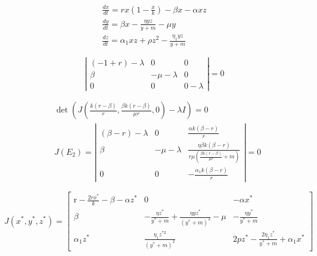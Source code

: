 \documentclass{wscpaperproc}
\theoremstyle{wsc}
\begin{document}
\begin{equation} \label{twoPreyonePredatorEDO}
	\begin{gathered}
		\frac{d x}{d t}=r x\left(1-\frac{x}{k}\right)-\beta x-\alpha x z \\
		\frac{d y}{d t}=\beta x-\frac{\eta y z}{y+m}-\mu y \\
		\frac{d z}{d t}=\alpha_1 x z+\rho z^2-\frac{\eta_1 y z}{y+m}
	\end{gathered}
\end{equation}

\begin{equation} \label{Characteristic000}
	\left|\begin{array}{ccc}
		(-1+r)-\lambda & 0            & 0         \\
		\beta          & -\mu-\lambda & 0         \\
		0              & 0            & 0-\lambda
	\end{array}\right|=0
\end{equation}

\begin{equation} \label{Equilibrium}
	\begin{aligned}
		 & \operatorname{det}\left(J\left(\frac{k(r-\beta)}{r}, \frac{\beta k(r-\beta)}{\mu r}, 0\right)-\lambda I\right)=0                            \\
		 & J\left(E_2\right)=\left|\begin{array}{ccc}
			                           (\beta-r)-\lambda & 0            & \frac{\alpha k(\beta-r)}{r}                                                      \\
			                           \beta             & -\mu-\lambda & \frac{\eta \beta k(\beta-r)}{r \mu\left(\frac{\beta k(r-\beta)}{\mu r}+m\right)} \\
			                           0                 & 0            & -\frac{\alpha_1 k(\beta-r)}{r}
		                           \end{array}\right|=0
	\end{aligned}
\end{equation}

\begin{equation} \label{CharacteristicPolynomial}
	J\left(x^*, y^*, z^*\right)=\left[\begin{array}{ccc}
			\mathrm{r}-\frac{2 r x^*}{k}-\beta-\alpha z^* & 0                                                                   & -\alpha x^*                                     \\
			\beta                                         & -\frac{\eta z^*}{y^*+m}+\frac{\eta y z^*}{\left(y^*+m\right)^2}-\mu & -\frac{\eta y^*}{y^*+m}                         \\
			\alpha_1 z^*                                  & \frac{\eta_1 z^{* 2}}{\left(y^*+m\right)^2}                         & 2 p z^*-\frac{2 \eta_1 z^*}{y^*+m}+\alpha_1 x^*
		\end{array}\right]
\end{equation}
\end{document}

